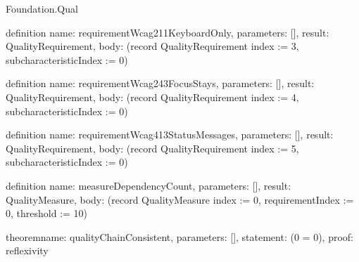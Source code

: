 \begin{lexlean}{Foundation.Qual}
\begin{semanticmodule}
definition{
  name: requirementWcag211KeyboardOnly,
  parameters: [],
  result: QualityRequirement,
  body: (record QualityRequirement {index := 3, subcharacteristicIndex := 0})
}

definition{
  name: requirementWcag243FocusStays,
  parameters: [],
  result: QualityRequirement,
  body: (record QualityRequirement {index := 4, subcharacteristicIndex := 0})
}

definition{
  name: requirementWcag413StatusMessages,
  parameters: [],
  result: QualityRequirement,
  body: (record QualityRequirement {index := 5, subcharacteristicIndex := 0})
}

definition{
  name: measureDependencyCount,
  parameters: [],
  result: QualityMeasure,
  body: (record QualityMeasure {index := 0, requirementIndex := 0, threshold := 10})
}

theorem{name: qualityChainConsistent, parameters: [], statement: (0 = 0), proof: reflexivity{}}
\end{semanticmodule}
\end{lexlean}
